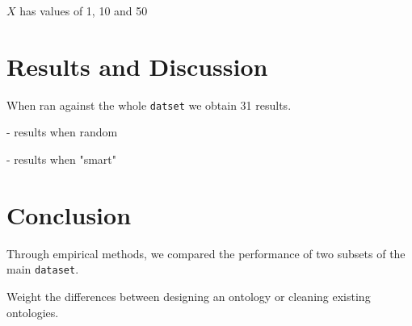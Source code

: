 \documentclass[runningheads,a4paper]{../../StyleFiles/llncs}
\begin{document}
$X$ has values of 1, 10 and 50

\section{Results and Discussion}
When ran against the whole \texttt{datset} we obtain 31 results. 

- results when random 

- results when "smart"

\section{Conclusion}
Through empirical methods, we compared the performance of two subsets of the main \texttt{dataset}. 

Weight the differences between designing an ontology or cleaning existing ontologies.



\end{document}
